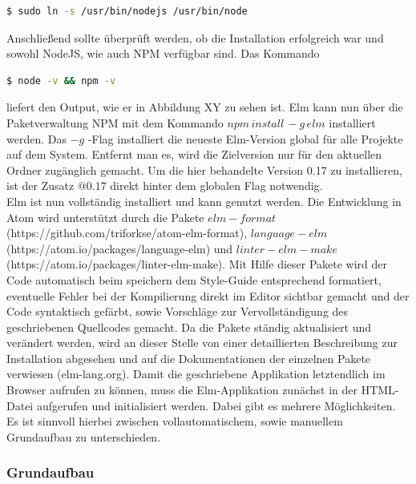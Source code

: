 \begin{lstlisting}[language=bash]
$ sudo ln -s /usr/bin/nodejs /usr/bin/node
\end{lstlisting}
Anschließend sollte überprüft werden, ob die Installation erfolgreich war und sowohl NodeJS, wie auch NPM verfügbar sind. Das Kommando \begin{lstlisting}[language=bash]
$ node -v && npm -v
\end{lstlisting}
liefert den Output, wie er in Abbildung XY zu sehen ist. Elm kann nun über die Paketverwaltung NPM mit dem Kommando 
$npm\,install\,-g\,elm$ installiert werden. Das $-g$ -Flag installiert die neueste Elm-Version global für alle Projekte auf dem System. Entfernt man es, wird die Zielversion nur für den aktuellen Ordner zugänglich gemacht. Um die hier behandelte Version 0.17 zu installieren, ist der Zusatz $@0.17$ direkt hinter dem globalen Flag notwendig.\\
Elm ist nun vollständig installiert und kann genutzt werden. Die Entwicklung in Atom wird unterstützt durch die Pakete $elm-format$\\ (https://github.com/triforkse/atom-elm-format), $language-elm$\\ (https://atom.io/packages/language-elm) und {$linter-elm-make$}\\ (https://atom.io/packages/linter-elm-make). Mit Hilfe dieser Pakete wird der Code automatisch beim speichern dem Style-Guide entsprechend formatiert, eventuelle Fehler bei der Kompilierung direkt im Editor sichtbar gemacht und der Code syntaktisch gefärbt, sowie Vorschläge zur Vervollständigung des geschriebenen Quellcodes gemacht. Da die Pakete ständig aktualisiert und verändert werden, wird an dieser Stelle von einer detaillierten Beschreibung zur Installation abgesehen und auf die Dokumentationen der einzelnen Pakete verwiesen (elm-lang.org).
Damit die geschriebene Applikation letztendlich im Browser aufrufen zu können, muss die Elm-Applikation zunächst in der HTML-Datei aufgerufen und initialisiert werden. Dabei gibt es mehrere Möglichkeiten. Es ist sinnvoll hierbei zwischen vollautomatischem, sowie manuellem Grundaufbau zu unterschieden.
\subsubsection{Grundaufbau}
\label{sec:Grundaufbau}

